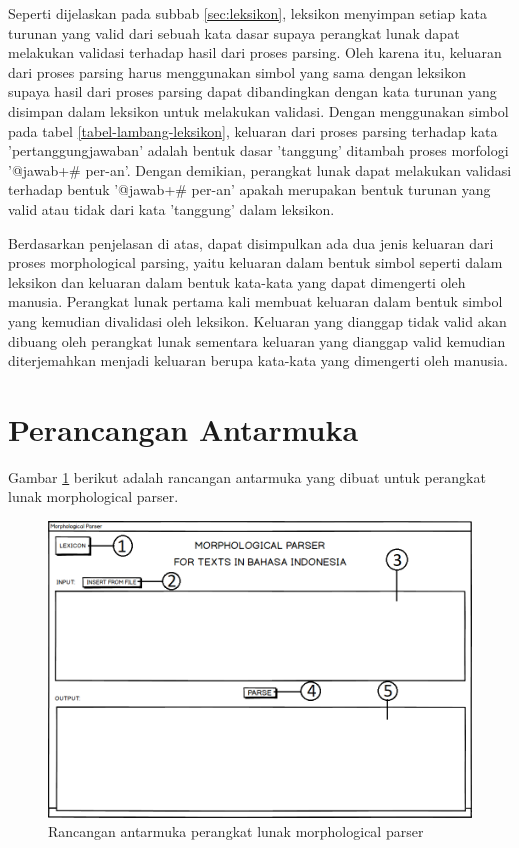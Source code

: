 Seperti dijelaskan pada subbab \ref{sec:leksikon}, leksikon menyimpan setiap kata turunan yang valid dari sebuah kata dasar supaya perangkat lunak dapat melakukan validasi terhadap hasil dari proses parsing. Oleh karena itu, keluaran dari proses parsing harus menggunakan simbol yang sama dengan leksikon supaya hasil dari proses parsing dapat dibandingkan dengan kata turunan yang disimpan dalam leksikon untuk melakukan validasi. Dengan menggunakan simbol pada tabel \ref{tabel-lambang-leksikon}, keluaran dari proses parsing terhadap kata 'pertanggungjawaban' adalah bentuk dasar 'tanggung' ditambah proses morfologi '@jawab+\# per-an'. Dengan demikian, perangkat lunak dapat melakukan validasi terhadap bentuk '@jawab+\# per-an' apakah merupakan bentuk turunan yang valid atau tidak dari kata 'tanggung' dalam leksikon.

Berdasarkan penjelasan di atas, dapat disimpulkan ada dua jenis keluaran dari proses morphological parsing, yaitu keluaran dalam bentuk simbol seperti dalam leksikon dan keluaran dalam bentuk kata-kata yang dapat dimengerti oleh manusia. Perangkat lunak pertama kali membuat keluaran dalam bentuk simbol yang kemudian divalidasi oleh leksikon. Keluaran yang dianggap tidak valid akan dibuang oleh perangkat lunak sementara keluaran yang dianggap valid kemudian diterjemahkan menjadi keluaran berupa kata-kata yang dimengerti oleh manusia.

\section{Perancangan Antarmuka}
\label{sec:perancanganAntarmuka}

Gambar \ref{mockup-parser} berikut adalah rancangan antarmuka yang dibuat untuk perangkat lunak morphological parser.

\begin{figure}[H]
\centering
\includegraphics[scale=0.7]{Gambar/mockup-parser}
\caption{Rancangan antarmuka perangkat lunak morphological parser} 
\label{mockup-parser}
\end{figure}

